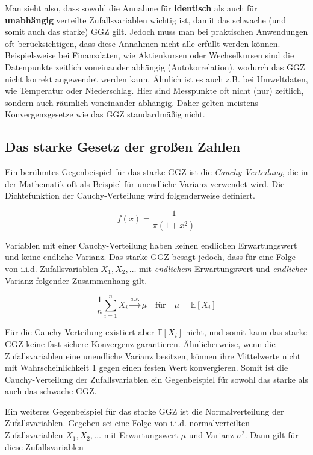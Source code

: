 \documentclass[aodsor,preprint]{imsart}
\numberwithin{equation}{section}
\theoremstyle{plain}
\begin{document}
Man sieht also, dass sowohl die Annahme für \textbf{identisch} als auch für \textbf{unabhängig} verteilte Zufallsvariablen wichtig ist, damit das schwache (und somit auch das starke) GGZ gilt.
Jedoch muss man bei praktischen Anwendungen oft berücksichtigen, dass diese Annahmen nicht alle erfüllt werden können.
Beispielsweise bei Finanzdaten, wie Aktienkursen oder Wechselkursen sind die Datenpunkte zeitlich voneinander abhängig (Autokorrelation), wodurch das GGZ nicht korrekt angewendet werden kann.
Ähnlich ist es auch z.B. bei Umweltdaten, wie Temperatur oder Niederschlag.
Hier sind Messpunkte oft nicht (nur) zeitlich, sondern auch räumlich voneinander abhängig.
Daher gelten meistens Konvergenzgesetze wie das GGZ standardmäßig nicht.


\subsection{Das starke Gesetz der großen Zahlen}


Ein berühmtes Gegenbeispiel für das starke GGZ ist die \textit{Cauchy-Verteilung}, die in der Mathematik oft als Beispiel für unendliche Varianz verwendet wird. Die Dichtefunktion der Cauchy-Verteilung wird folgenderweise definiert.

\[
f(x) = \frac{1}{\pi (1 + x^2)}
\]

Variablen mit einer Cauchy-Verteilung haben keinen endlichen Erwartungswert und keine endliche Varianz.
Das starke GGZ besagt jedoch, dass für eine Folge von i.i.d. Zufallsvariablen \( X_1, X_2, \dots \) mit \textit{endlichem} Erwartungswert und \textit{endlicher} Varianz folgender Zusammenhang gilt.

\[
\frac{1}{n} \sum_{i=1}^n X_i \xrightarrow{a.s.} \mu \quad \text{für} \quad \mu = \mathbb{E}[X_i]
\]

Für die Cauchy-Verteilung existiert aber \(\mathbb{E}[X_i]\) nicht, und somit kann das starke GGZ keine fast sichere Konvergenz garantieren.
Ähnlicherweise, wenn die Zufallsvariablen eine unendliche Varianz besitzen, können ihre Mittelwerte nicht mit Wahrscheinlichkeit 1 gegen einen festen Wert konvergieren.
Somit ist die Cauchy-Verteilung der Zufallsvariablen ein Gegenbeispiel für sowohl das starke als auch das schwache GGZ.


Ein weiteres Gegenbeispiel für das starke GGZ ist die Normalverteilung der Zufallsvariablen. Gegeben sei eine Folge von i.i.d. normalverteilten Zufallsvariablen \( X_1, X_2, \dots \) mit Erwartungswert \(\mu\) und Varianz \(\sigma^2\). Dann gilt für diese Zufallsvariablen
\end{document}

